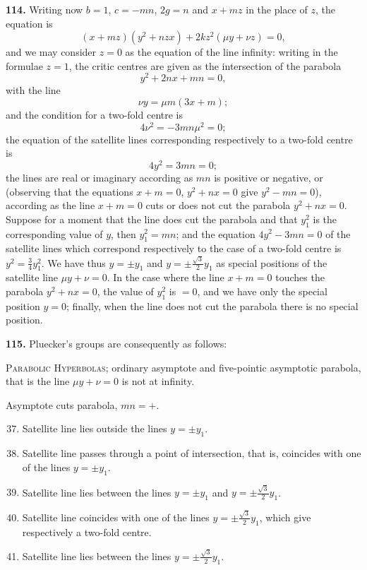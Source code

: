 \documentclass[11pt,a4paper]{article}
\theoremstyle{plain}
\begin{document}
\noindent\textbf{114.} Writing now $b=1$, $c = -mn$, $2g = n$ and $x + mz$ in the place of $z$, the equation is
\[
(x + mz)(y^2 + nzx) + 2kz^2(\mu y + \nu z) = 0,
\]
and we may consider $z = 0$ as the equation of the line infinity: writing in the formulae $z=1$, the critic centres are given as the intersection of the parabola
\[
y^2 + 2nx + mn = 0,
\]
with the line
\[
\nu y = \mu m(3x + m);
\]
and the condition for a two-fold centre is
\[
4\nu^2 = -3mn\mu^2 = 0;
\]
the equation of the satellite lines corresponding respectively to a two-fold centre is
\[
4y^2 = 3mn = 0;
\]
the lines are real or imaginary according as $mn$ is positive or negative, or (observing that the equations $x+m=0$, $y^2+nx=0$ give $y^2-mn=0$), according as the line $x+m=0$ cuts or does not cut the parabola $y^2+nx=0$. Suppose for a moment that the line does cut the parabola and that $y_1^2$ is the corresponding value of $y$, then $y_1^2 = mn$; and the equation $4y^2 - 3mn = 0$ of the satellite lines which correspond respectively to the case of a two-fold centre is $y^2 = \tfrac{3}{4}y_1^2$. We have thus $y = \pm y_1$ and $y = \pm\tfrac{\sqrt{3}}{2}y_1$ as special positions of the satellite line $\mu y + \nu = 0$. In the case where the line $x+m=0$ touches the parabola $y^2+nx=0$, the value of $y_1^2$ is $=0$, and we have only the special position $y=0$; finally, when the line does not cut the parabola there is no special position.

\noindent\textbf{115.} Pluecker's groups are consequently as follows:

\textsc{Parabolic Hyperbolas}; ordinary asymptote and five-pointic asymptotic parabola, that is the line $\mu y + \nu = 0$ is not at infinity.

Asymptote cuts parabola, $mn = +$.
\begin{enumerate}[label=\textsc{\Roman*.},nosep]
\setcounter{enumi}{36}
\item Satellite line lies outside the lines $y = \pm y_1$.
\item Satellite line passes through a point of intersection, that is, coincides with one of the lines $y = \pm y_1$.
\item Satellite line lies between the lines $y = \pm y_1$ and $y = \pm\tfrac{\sqrt{3}}{2}y_1$.
\item Satellite line coincides with one of the lines $y = \pm\tfrac{\sqrt{3}}{2}y_1$, which give respectively a two-fold centre.
\item Satellite line lies between the lines $y = \pm\tfrac{\sqrt{3}}{2}y_1$.
\end{enumerate}
\end{document}
